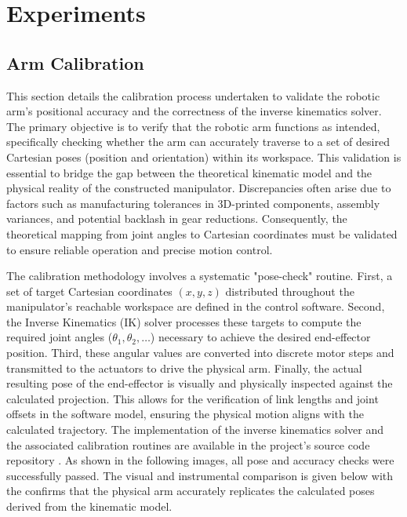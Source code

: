 \chapter{Experiments}

\section{Arm Calibration}
This section details the calibration process undertaken to validate the robotic
arm's positional accuracy and the correctness of the inverse kinematics solver.
The primary objective is to verify that the robotic arm functions as intended,
specifically checking whether the arm can accurately traverse to a set of desired Cartesian poses (position and orientation) within its workspace. This validation is essential to bridge the gap between the theoretical kinematic model and the physical reality of the constructed manipulator. Discrepancies often arise due to factors such as manufacturing tolerances in 3D-printed components, assembly variances, and potential backlash in gear reductions. Consequently, the theoretical mapping from joint angles to Cartesian coordinates must be validated to ensure reliable operation and precise motion control.

The calibration methodology involves a systematic "pose-check" routine. First, a set of target Cartesian 
coordinates $(x, y, z)$ distributed throughout the manipulator's reachable workspace are defined in the control software. 
Second, the Inverse Kinematics (IK) solver processes these targets to compute the required joint 
angles ($\theta_1, \theta_2, \dots$) necessary to achieve the desired end-effector position. Third, these angular 
values are converted into discrete motor steps and transmitted to the actuators to drive the physical arm. Finally, 
the actual resulting pose of the end-effector is visually and physically inspected against the calculated projection. 
This allows for the verification of link lengths and joint offsets in the software model, ensuring the physical motion 
aligns with the calculated trajectory. The implementation of the inverse kinematics solver and the associated calibration 
routines are available in the project's source code repository \cite{robotarmrepo}. As shown in the following images, all 
pose and accuracy checks were successfully passed. The visual and instrumental comparison is given below with the confirms that the physical arm accurately 
replicates the calculated poses derived from the kinematic model.

